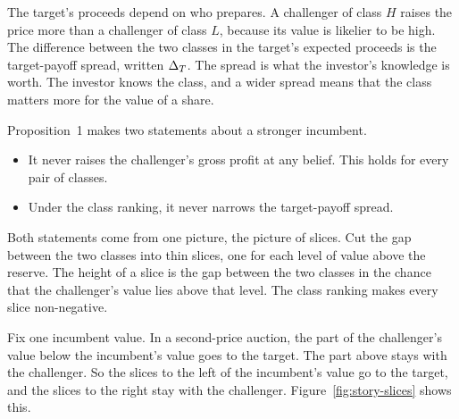 The target's proceeds depend on who prepares. A challenger of class \(H\) raises the price more than a challenger of class \(L\), because its value is likelier to be high. The difference between the two classes in the target's expected proceeds is the target-payoff spread, written \(\Delta_T\). The spread is what the investor's knowledge is worth. The investor knows the class, and a wider spread means that the class matters more for the value of a share.

Proposition~1 makes two statements about a stronger incumbent.
\begin{itemize}
\item[(a)] It never raises the challenger's gross profit at any belief. This holds for every pair of classes.
\item[(b)] Under the class ranking, it never narrows the target-payoff spread.
\end{itemize}

Both statements come from one picture, the picture of slices. Cut the gap between the two classes into thin slices, one for each level of value above the reserve. The height of a slice is the gap between the two classes in the chance that the challenger's value lies above that level. The class ranking makes every slice non-negative.

Fix one incumbent value. In a second-price auction, the part of the challenger's value below the incumbent's value goes to the target. The part above stays with the challenger. So the slices to the left of the incumbent's value go to the target, and the slices to the right stay with the challenger. Figure~\ref{fig:story-slices} shows this.

